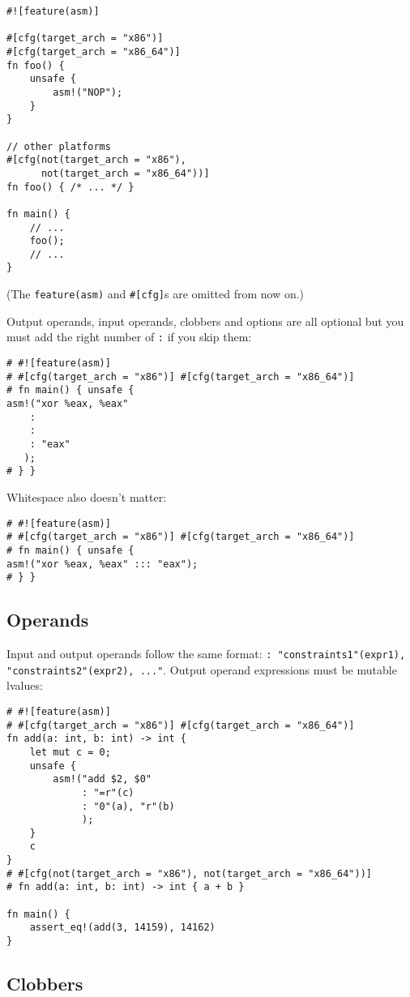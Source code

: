 \documentclass[]{article}
\begin{document}
\begin{verbatim}
#![feature(asm)]

#[cfg(target_arch = "x86")]
#[cfg(target_arch = "x86_64")]
fn foo() {
    unsafe {
        asm!("NOP");
    }
}

// other platforms
#[cfg(not(target_arch = "x86"),
      not(target_arch = "x86_64"))]
fn foo() { /* ... */ }

fn main() {
    // ...
    foo();
    // ...
}
\end{verbatim}

(The \texttt{feature(asm)} and \texttt{\#{[}cfg{]}}s are omitted from
now on.)

Output operands, input operands, clobbers and options are all optional
but you must add the right number of \texttt{:} if you skip them:

\begin{verbatim}
# #![feature(asm)]
# #[cfg(target_arch = "x86")] #[cfg(target_arch = "x86_64")]
# fn main() { unsafe {
asm!("xor %eax, %eax"
    :
    :
    : "eax"
   );
# } }
\end{verbatim}

Whitespace also doesn't matter:

\begin{verbatim}
# #![feature(asm)]
# #[cfg(target_arch = "x86")] #[cfg(target_arch = "x86_64")]
# fn main() { unsafe {
asm!("xor %eax, %eax" ::: "eax");
# } }
\end{verbatim}

\subsection{Operands}\label{operands}

Input and output operands follow the same format:
\texttt{: "constraints1"(expr1), "constraints2"(expr2), ..."}. Output
operand expressions must be mutable lvalues:

\begin{verbatim}
# #![feature(asm)]
# #[cfg(target_arch = "x86")] #[cfg(target_arch = "x86_64")]
fn add(a: int, b: int) -> int {
    let mut c = 0;
    unsafe {
        asm!("add $2, $0"
             : "=r"(c)
             : "0"(a), "r"(b)
             );
    }
    c
}
# #[cfg(not(target_arch = "x86"), not(target_arch = "x86_64"))]
# fn add(a: int, b: int) -> int { a + b }

fn main() {
    assert_eq!(add(3, 14159), 14162)
}
\end{verbatim}

\subsection{Clobbers}\label{clobbers}
\end{document}
